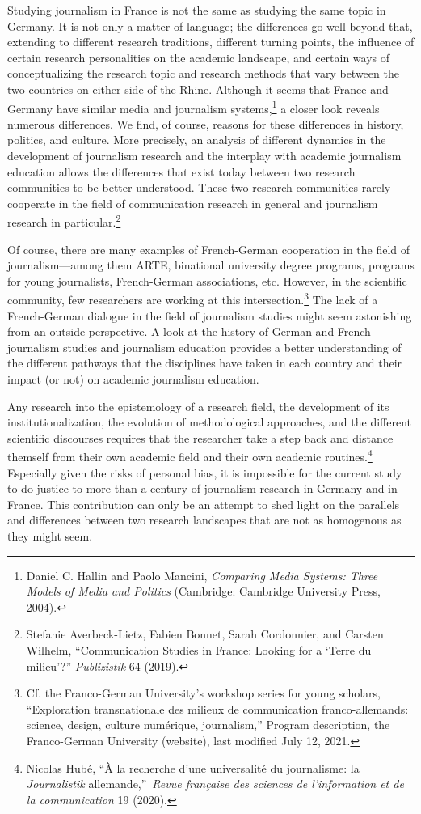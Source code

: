 \documentclass{tufte-handout}
\begin{document}
Studying journalism in France is not the same as studying the same topic
in Germany. It is not only a matter of language; the differences go well
beyond that, extending to different research traditions, different
turning points, the influence of certain research personalities on the
academic landscape, and certain ways of conceptualizing the research
topic and research methods that vary between the two countries on either
side of the Rhine. Although it seems that France and Germany have
similar media and journalism systems,\footnote{Daniel C. Hallin and
  Paolo Mancini, \emph{Comparing Media Systems: Three Models of Media
  and Politics} (Cambridge: Cambridge University Press, 2004).} a closer
look reveals numerous differences. We find, of course, reasons for these
differences in history, politics, and culture. More precisely, an
analysis of different dynamics in the development of journalism research
and the interplay with academic journalism education allows the
differences that exist today between two research communities to be
better understood. These two research communities rarely cooperate in
the field of communication research in general and journalism research
in particular.\footnote{Stefanie Averbeck-Lietz, Fabien Bonnet, Sarah
  Cordonnier, and Carsten Wilhelm, ``Communication Studies in France:
  Looking for a `Terre du milieu'?'' \emph{Publizistik} 64 (2019).}

Of course, there are many examples of French-German cooperation in the
field of journalism---among them ARTE, binational university degree
programs, programs for young journalists, French-German associations,
etc. However, in the scientific community, few researchers are working
at this intersection.\footnote{Cf. the Franco-German University's
  workshop series for young scholars, ``Exploration transnationale des
  milieux de communication franco-allemands: science, design, culture
  numérique, journalism,'' Program description, the Franco-German
  University (website), last modified July 12, 2021.} The lack of a
French-German dialogue in the field of journalism studies might seem
astonishing from an outside perspective. A look at the history of German
and French journalism studies and journalism education provides a better
understanding of the different pathways that the disciplines have taken
in each country and their impact (or not) on academic journalism
education.

Any research into the epistemology of a research field, the development
of its institutionalization, the evolution of methodological approaches,
and the different scientific discourses requires that the researcher
take a step back and distance themself from their own academic field and
their own academic routines.\footnote{Nicolas Hubé, ``À la recherche
  d'une universalité du journalisme: la \emph{Journalistik}
  allemande,''~\emph{Revue française des sciences de l'information et de
  la communication} 19 (2020).} Especially given the risks of personal
bias, it is impossible for the current study to do justice to more than
a century of journalism research in Germany and in France. This
contribution can only be an attempt to shed light on the parallels and
differences between two research landscapes that are not as homogenous
as they might seem.
\end{document}
